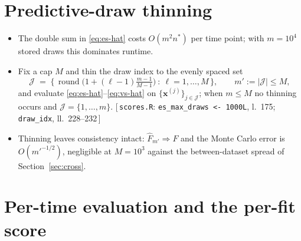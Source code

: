 \documentclass[11pt]{article}
\newcommand{\impl}[1]{{\footnotesize\textsf{\textcolor{blue!45!black}{[\,#1\,]}}}}
\begin{document}
\section{Predictive-draw thinning}
\label{sec:thinning}

\begin{itemize}[leftmargin=1.5em, itemsep=3pt]
  \item The double sum in \eqref{eq:es-hat} costs $O(m^2 n^\ast)$ per
        time point; with $m=10^4$ stored draws this dominates runtime.
  \item Fix a cap $M$ and thin the draw index to the evenly spaced set
        \begin{equation}
          \mathcal J \;=\; \Big\{\,
            \operatorname{round}\!\big(1+(\ell-1)\tfrac{m-1}{M-1}\big)
            \ :\ \ell=1,\dots,M\,\Big\},
          \qquad
          m' := |\mathcal J|\le M,
          \label{eq:thin}
        \end{equation}
        and evaluate \eqref{eq:es-hat}--\eqref{eq:vs-hat} on
        $\{\bm x^{(j)}\}_{j\in\mathcal J}$; when $m\le M$ no thinning
        occurs and $\mathcal J=\{1,\dots,m\}$.
        \impl{\texttt{scores.R}: \texttt{es\_max\_draws <- 1000L}, l.~175; \texttt{draw\_idx}, ll.~228--232}
  \item Thinning leaves consistency intact: $\hat F_{m'}\Rightarrow F$ and
        the Monte Carlo error is $O(m'^{-1/2})$, negligible at
        $M=10^3$ against the between-dataset spread of
        Section~\ref{sec:cross}.
\end{itemize}

\section{Per-time evaluation and the per-fit score}
\label{sec:perfit}
\end{document}
